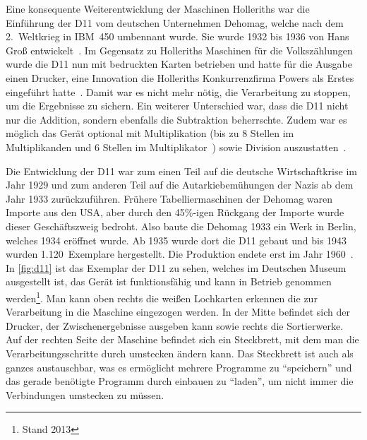 \documentclass[parskip=half]{scrartcl}
\begin{document}
Eine konsequente Weiterentwicklung der Maschinen Holleriths war die Einführung
der D11 vom deutschen Unternehmen Dehomag, welche nach dem 2.~Weltkrieg in
IBM~450 umbennant wurde. Sie wurde 1932 bis 1936 von Hans Groß
entwickelt~\cite{deutschesMuseum}. Im Gegensatz zu Holleriths Maschinen für die
Volkszählungen wurde die D11 nun mit bedruckten Karten betrieben und hatte für
die Ausgabe einen Drucker, eine Innovation die Holleriths Konkurrenzfirma Powers als
Erstes eingeführt hatte~\cite{austrian1982herman}. Damit war es nicht mehr
nötig, die Verarbeitung zu stoppen, um die Ergebnisse zu sichern. Ein weiterer
Unterschied war, dass die D11 nicht nur die Addition, sondern ebenfalls
die Subtraktion beherrschte. Zudem war es möglich das Gerät optional mit
Multiplikation (bis zu 8 Stellen im Multiplikanden und 6 Stellen im
Multiplikator~\cite{rojas2002first}) sowie Division
auszustatten~\cite{deutschesMuseum}.

Die Entwicklung der D11 war zum einen Teil auf die deutsche Wirtschaftkrise im
Jahr 1929 und zum anderen Teil auf die Autarkiebemühungen der Nazis ab dem Jahr 1933
zurückzuführen. Frühere Tabelliermaschinen der Dehomag waren Importe aus den
USA, aber durch den 45\%-igen Rückgang der Importe wurde dieser Geschäftszweig
bedroht. Also baute die Dehomag 1933 ein Werk in Berlin, welches 1934 eröffnet
wurde. Ab 1935 wurde dort die D11 gebaut und bis 1943 wurden 1.120~Exemplare
hergestellt. Die Produktion endete erst im Jahr 1960~\cite{heide2009punched}.
In \autoref{fig:d11} ist das Exemplar der D11 zu sehen, welches im Deutschen
Museum ausgestellt ist, das Gerät ist funktionsfähig und kann in Betrieb
genommen werden\footnote{Stand 2013}. Man kann oben rechts die weißen
Lochkarten erkennen die zur Verarbeitung in die Maschine eingezogen werden. In
der Mitte befindet sich der Drucker, der Zwischenergebnisse ausgeben kann sowie
rechts die Sortierwerke. Auf der rechten Seite der Maschine befindet sich ein
Steckbrett, mit dem man die Verarbeitungsschritte durch umstecken ändern kann.
Das Steckbrett ist auch als ganzes austauschbar, was es ermöglicht mehrere
Programme zu \enquote{speichern} und das gerade benötigte Programm durch
einbauen zu \enquote{laden}, um nicht immer die Verbindungen umstecken zu
müssen.
\end{document}
